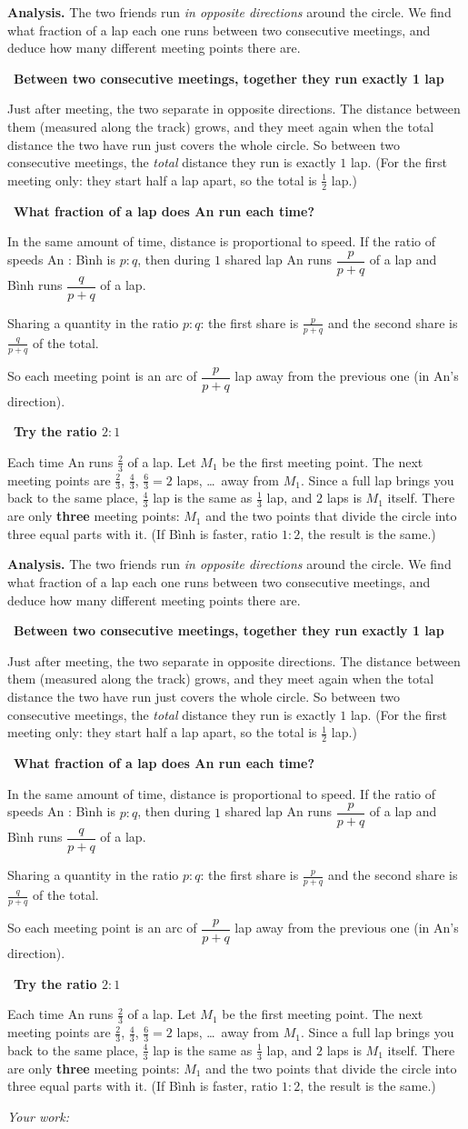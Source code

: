 \documentclass[11pt]{article}
\newif\ifsol \soltrue
\newcommand{\probsol}[1]{%
  \begin{lrbox}{\solmeasure}\begin{minipage}{\dimexpr\linewidth-24pt\relax}#1\end{minipage}\end{lrbox}%
  \ifsol
    \begin{solbox}#1\end{solbox}%
  \else
    \setlength{\solht}{\dimexpr\ht\solmeasure+\dp\solmeasure+0.85cm\relax}%
    \ifdim\solht<1.35cm\setlength{\solht}{1.35cm}\fi
    \ifdim\solht>\StudentMaxWork\setlength{\solht}{\StudentMaxWork}\fi
    \begin{tcolorbox}[colback=white,colframe=Line,boxrule=0.8pt,arc=5pt,
      left=8pt,right=8pt,top=4pt,bottom=4pt,height=\solht]{\footnotesize\color{Slate}\itshape\WorkWord}\end{tcolorbox}%
  \fi}
\newlength{\StudentMaxWork}\setlength{\StudentMaxWork}{7.5cm}
\newcommand{\step}[2]{\par\smallskip\noindent{\bfseries\color{tmBlue!85!black}\StepWord~#1.}\ {\bfseries #2}\par\nopagebreak}
\def\WorkWord{Your work:}
\def\StepWord{Step}
\begin{document}
\probsol{
\textbf{Analysis.} The two friends run \emph{in opposite directions} around the circle. We find what fraction of a lap each one runs between two consecutive meetings, and deduce how many different meeting points there are.

\step{1}{Between two consecutive meetings, together they run exactly 1 lap}
\begin{proofbox}Just after meeting, the two separate in opposite directions. The distance between them (measured along the track) grows, and they meet again when the total distance the two have run just covers the whole circle. So between two consecutive meetings, the \emph{total} distance they run is exactly $1$ lap. (For the first meeting only: they start half a lap apart, so the total is $\frac12$ lap.)\end{proofbox}

\step{2}{What fraction of a lap does An run each time?}
In the same amount of time, distance is proportional to speed. If the ratio of speeds An : Bình is $p:q$, then during $1$ shared lap An runs $\dfrac{p}{p+q}$ of a lap and Bình runs $\dfrac{q}{p+q}$ of a lap.
\begin{recallbox}Sharing a quantity in the ratio $p:q$: the first share is $\frac{p}{p+q}$ and the second share is $\frac{q}{p+q}$ of the total.\end{recallbox}
So each meeting point is an arc of $\dfrac{p}{p+q}$ lap away from the previous one (in An's direction).

\step{3}{Try the ratio $2:1$}
Each time An runs $\frac{2}{3}$ of a lap. Let $M_1$ be the first meeting point. The next meeting points are $\frac23$, $\frac43$, $\frac63=2$ laps, \dots\ away from $M_1$. Since a full lap brings you back to the same place, $\frac43$ lap is the same as $\frac13$ lap, and $2$ laps is $M_1$ itself. There are only \textbf{three} meeting points: $M_1$ and the two points that divide the circle into three equal parts with it. (If Bình is faster, ratio $1:2$, the result is the same.)

}
\end{document}
